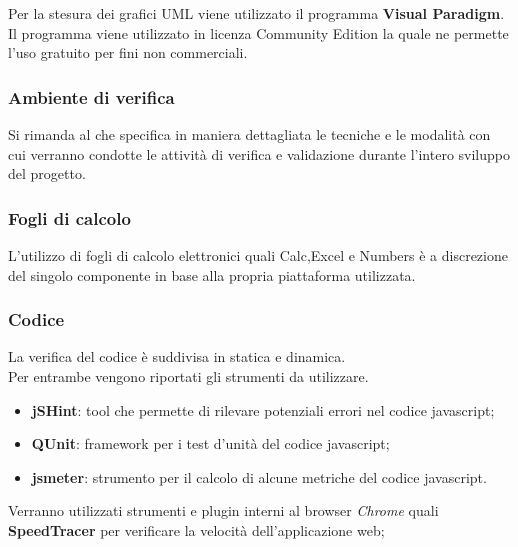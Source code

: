 Per la stesura dei grafici UML viene utilizzato il programma \textbf{Visual Paradigm}. Il programma viene utilizzato in licenza Community Edition la quale ne permette l’uso gratuito per fini non commerciali.



\subsubsection{Ambiente di verifica}

Si rimanda al \href{run:../../Esterni/Piano di qualifica/\PianoQual}{\PianoQualEscape} che specifica in maniera dettagliata
le tecniche e le modalità con cui verranno condotte le attività di verifica e validazione durante l’intero sviluppo del progetto.

\subsubsection{Fogli di calcolo}
L'utilizzo di fogli di calcolo elettronici quali Calc,Excel e Numbers è a discrezione del singolo componente in base alla propria piattaforma utilizzata.


\subsubsection{Codice} 

La verifica del codice \`{e} suddivisa in statica e dinamica.\\ 
Per entrambe vengono riportati gli strumenti da utilizzare. 


  \begin{itemize}
  \item \textbf{jSHint}: tool che permette di rilevare potenziali errori nel codice javascript;
  \item \textbf{QUnit}: framework per i test d'unit\`{a} del codice javascript;
  \item \textbf{jsmeter}: strumento per il calcolo di alcune metriche del codice javascript.
  \end{itemize}

Verranno utilizzati strumenti e plugin interni al browser \emph{Chrome} quali \textbf{SpeedTracer} per verificare la velocità dell'applicazione web;



